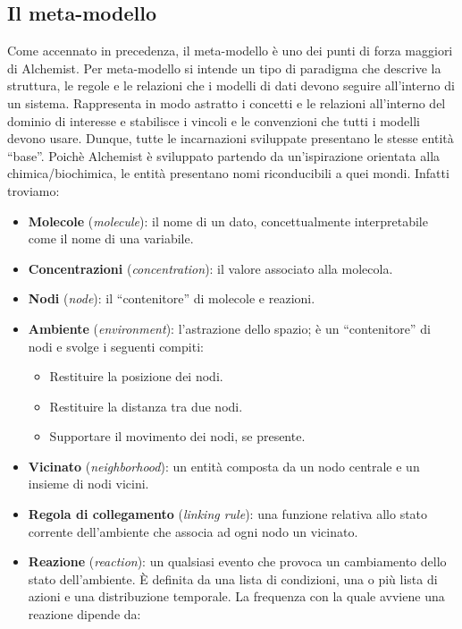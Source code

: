 \subsection{Il meta-modello} 
Come accennato in precedenza, il meta-modello è uno dei punti di forza maggiori di Alchemist. 
Per meta-modello si intende un tipo di paradigma che descrive la struttura, le regole e le relazioni
che i modelli di dati devono seguire all'interno di un sistema. Rappresenta in modo astratto i 
concetti e le relazioni all'interno del dominio di interesse e stabilisce i vincoli e le convenzioni
che tutti i modelli devono usare. Dunque, tutte le incarnazioni sviluppate presentano le stesse entità
``base''. Poichè Alchemist è sviluppato partendo da un'ispirazione orientata alla chimica/biochimica,
le entità presentano nomi riconducibili a quei mondi. Infatti troviamo:
\begin{itemize}
    \item \textbf{Molecole} (\textit{molecule}): il nome di un dato, concettualmente interpretabile come il nome di una variabile.
    \item \textbf{Concentrazioni} (\textit{concentration}): il valore associato alla molecola.
    \item \textbf{Nodi}\label{node} (\textit{node}): il ``contenitore'' di molecole e reazioni.
    \item \textbf{Ambiente} (\textit{environment}): l'astrazione dello spazio; è un “contenitore” di nodi e svolge i seguenti compiti:
    \begin{itemize}
        \item Restituire la posizione dei nodi.
        \item Restituire la distanza tra due nodi.
        \item Supportare il movimento dei nodi, se presente.
    \end{itemize}
    \item \textbf{Vicinato} (\textit{neighborhood}): un entità composta da un nodo centrale e un insieme di nodi vicini.
    \item \textbf{Regola di collegamento} (\textit{linking rule}): una funzione relativa allo stato corrente dell'ambiente che associa ad ogni nodo un vicinato.
    \item \textbf{Reazione} (\textit{reaction}): un qualsiasi evento che provoca un cambiamento dello stato dell'ambiente. È definita da una lista di condizioni, una o più lista di azioni e una distribuzione temporale. La frequenza con la quale avviene una reazione dipende da:

\end{itemize}
